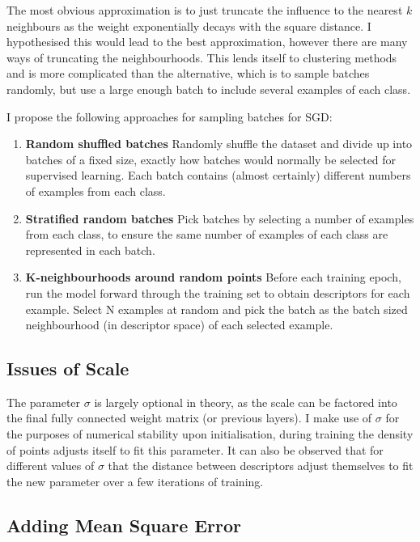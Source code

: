 The most obvious approximation is to just truncate the influence to the nearest $ k $ neighbours as the weight exponentially decays with the square distance. I hypothesised this would lead to the best approximation, however there are many ways of truncating the neighbourhoods. This lends itself to clustering methods and is more complicated than the alternative, which is to sample batches randomly, but use a large enough batch to include several examples of each class.

I propose the following approaches for sampling batches for \gls{SGD}:

\begin{enumerate}
\item {\bf Random shuffled batches}
 Randomly shuffle the dataset and divide up into batches of a fixed size, exactly how batches would normally be selected for supervised learning. Each batch contains (almost certainly) different numbers of examples from each class.
 \item {\bf Stratified random batches} 
 Pick batches by selecting a number of examples from each class, to ensure the same number of examples of each class are represented in each batch.   
 \item {\bf K-neighbourhoods around random points}
 Before each training epoch, run the model forward through the training set to obtain descriptors for each example. Select N examples at random and pick the batch as the batch sized neighbourhood (in descriptor space) of each selected example.
\end {enumerate}


\subsection {Issues of Scale}

The parameter $ \sigma $ is largely optional in theory, as the scale can be factored into the final fully connected weight matrix (or previous layers).  I make use of $ \sigma $ for the purposes of numerical stability upon initialisation, during training the density of points adjusts itself to fit this parameter. It can also be observed that for different values of $ \sigma $ that the distance between descriptors adjust themselves to fit the new parameter over a few iterations of training.


\subsection {Adding Mean Square Error}

